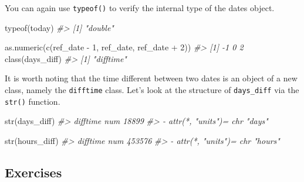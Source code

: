 \documentclass[
]{book}
\newenvironment{Shaded}{\begin{snugshade}}{\end{snugshade}}
\newcommand{\CommentTok}[1]{\textcolor[rgb]{0.56,0.35,0.01}{\textit{#1}}}
\newcommand{\DecValTok}[1]{\textcolor[rgb]{0.00,0.00,0.81}{#1}}
\newcommand{\FunctionTok}[1]{\textcolor[rgb]{0.00,0.00,0.00}{#1}}
\newcommand{\NormalTok}[1]{#1}
\newcommand{\SpecialCharTok}[1]{\textcolor[rgb]{0.00,0.00,0.00}{#1}}
\begin{document}
You can again use \texttt{typeof()} to verify the internal type of the dates object.

\begin{Shaded}
\begin{Highlighting}[]
\FunctionTok{typeof}\NormalTok{(today)}
\CommentTok{\#\textgreater{} [1] "double"}
\end{Highlighting}
\end{Shaded}

\begin{Shaded}
\begin{Highlighting}[]
\FunctionTok{as.numeric}\NormalTok{(}\FunctionTok{c}\NormalTok{(ref\_date }\SpecialCharTok{{-}} \DecValTok{1}\NormalTok{, ref\_date, ref\_date }\SpecialCharTok{+} \DecValTok{2}\NormalTok{))}
\CommentTok{\#\textgreater{} [1] {-}1  0  2}
\FunctionTok{class}\NormalTok{(days\_diff)}
\CommentTok{\#\textgreater{} [1] "difftime"}
\end{Highlighting}
\end{Shaded}

It is worth noting that the time different between two dates is an object of a new class, namely the \texttt{difftime} class. Let's look at the structure of \texttt{days\_diff} via the \texttt{str()} function.

\begin{Shaded}
\begin{Highlighting}[]
\FunctionTok{str}\NormalTok{(days\_diff)}
\CommentTok{\#\textgreater{}  \textquotesingle{}difftime\textquotesingle{} num 18899}
\CommentTok{\#\textgreater{}  {-} attr(*, "units")= chr "days"}
\end{Highlighting}
\end{Shaded}

\begin{Shaded}
\begin{Highlighting}[]
\FunctionTok{str}\NormalTok{(hours\_diff)}
\CommentTok{\#\textgreater{}  \textquotesingle{}difftime\textquotesingle{} num 453576}
\CommentTok{\#\textgreater{}  {-} attr(*, "units")= chr "hours"}
\end{Highlighting}
\end{Shaded}

\hypertarget{exercises-12}{%
\subsection{Exercises}\label{exercises-12}}
\end{document}
